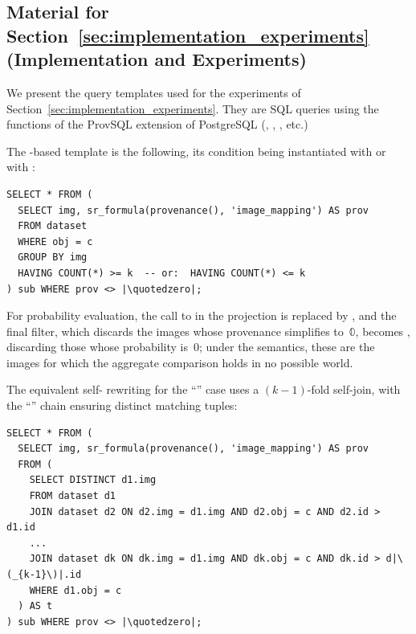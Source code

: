 \begin{toappendix}
  \section{Material for Section~\ref{sec:implementation_experiments}
  (Implementation and Experiments)}
\newcommand{\quotedzero}{\PYG{l+s+s1}{\apos$\mathbb{0}$\apos}}
\label{sec:appendix_impl_experiments}

We present the query templates used for the experiments of
Section~\ref{sec:implementation_experiments}. They are SQL queries using
the functions of the ProvSQL extension of PostgreSQL (, ,
, etc.)

The -based template is the following, its condition being
instantiated with  or with :
\newcommand{\apos}{\texttt{\textquotesingle}}
\begin{verbatim}
SELECT * FROM (
  SELECT img, sr_formula(provenance(), 'image_mapping') AS prov
  FROM dataset
  WHERE obj = c
  GROUP BY img
  HAVING COUNT(*) >= k  -- or:  HAVING COUNT(*) <= k
) sub WHERE prov <> |\quotedzero|;
\end{verbatim}

For probability evaluation, the call to  in the
projection is replaced by , and
the final filter, which
discards the images whose provenance simplifies to~$\mathbb 0$, becomes
, discarding those whose probability is~$0$; under the
 semantics, these are the images for which the aggregate
comparison holds in no possible world.

The equivalent self- rewriting for the ``'' case uses
a $(k{-}1)$-fold self-join, with the
``'' chain ensuring distinct matching tuples:
\begin{verbatim}
SELECT * FROM (
  SELECT img, sr_formula(provenance(), 'image_mapping') AS prov
  FROM (
    SELECT DISTINCT d1.img
    FROM dataset d1
    JOIN dataset d2 ON d2.img = d1.img AND d2.obj = c AND d2.id > d1.id
    ...
    JOIN dataset dk ON dk.img = d1.img AND dk.obj = c AND dk.id > d|\(_{k-1}\)|.id
    WHERE d1.obj = c
  ) AS t
) sub WHERE prov <> |\quotedzero|;
\end{verbatim}


\end{toappendix}
